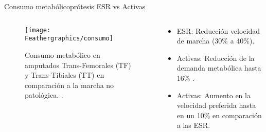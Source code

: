 \documentclass[10pt]{beamer}
\begin{document}
\begin{frame}{Consumo metabólico}{prótesis ESR vs Activas}

\begin{columns}[t]


\column{75 mm}
\begin{block}{}
{\footnotesize{}}

\begin{figure}
\begin{centering}
\texttt{[image: Feathergraphics/consumo]}
\par\end{centering}
\caption{{\footnotesize{}Consumo metabólico en amputados Trans-Femorales (TF) y Trans-Tibiales (TT) en comparación a la marcha no patológica. \cite{Schmalz2002}.}}\par
\end{figure}

\end{block}

\column{40 mm}
\begin{exampleblock}{}

\begin{itemize}
\item {\scriptsize{}ESR: Reducción velocidad de marcha (30\% a 40\%)\cite{Schmalz2002}.}{\scriptsize \par}
\end{itemize}
\vspace{12 mm}
\begin{itemize}
\item {\scriptsize{}Activas: Reducción de la demanda metabólica hasta 16\%
\cite{Herr2010,Esposito2015}.}{\scriptsize \par}
\end{itemize}
\vspace{12 mm}
\begin{itemize}
\item {\scriptsize{}Activas: Aumento en la velocidad preferida hasta en
un 10\% en comparación a las ESR\cite{Gates2013}.}{\scriptsize \par}
\end{itemize}
\end{exampleblock}
\end{columns}

\end{frame}
\end{document}
